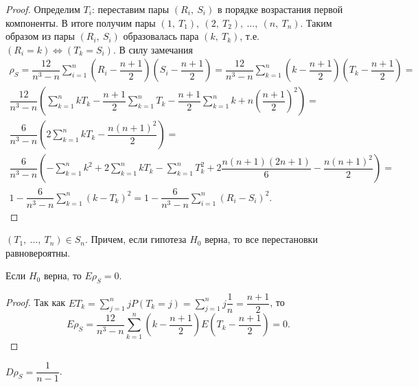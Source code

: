 \begin{proof}
    Определим $\displaystyle T_{i}$: переставим пары $\displaystyle \left( R_{i} ,\ S_{i}\right)$ в порядке возрастания первой компоненты. В итоге получим пары $\displaystyle \left( 1,\ T_{1}\right) ,\ \left( 2,\ T_{2}\right) ,\ \dotsc ,\ \left( n,\ T_{n}\right)$. Таким образом из пары $\displaystyle ( R_{i} ,\ S_{i})$ образовалась пара $\displaystyle \left( k,\ T_{k}\right)$, т.е. $\displaystyle \left( R_{i} =k\right) \Leftrightarrow \left( T_{k} =S_{i}\right)$. В силу замечания
    \begin{gather*}
        \rho _{S} =\dfrac{12}{n^{3} -n}\sum _{i=1}^{n}\left( R_{i} -\dfrac{n+1}{2}\right)\left( S_{i} -\dfrac{n+1}{2}\right) =\dfrac{12}{n^{3} -n}\sum _{k=1}^{n}\left( k-\dfrac{n+1}{2}\right)\left( T_{k} -\dfrac{n+1}{2}\right) =\\
        \dfrac{12}{n^{3} -n}\left(\sum _{k=1}^{n} kT_{k} -\dfrac{n+1}{2}\sum _{k=1}^{n} T_{k} -\dfrac{n+1}{2}\sum _{k=1}^{n} k+n\left(\dfrac{n+1}{2}\right)^{2}\right) =\\
        \dfrac{6}{n^{3} -n}\left( 2\sum _{k=1}^{n} kT_{k} -\dfrac{n( n+1)^{2}}{2}\right) =\\
        \dfrac{6}{n^{3} -n}\left( -\sum _{k=1}^{n} k^{2} +2\sum _{k=1}^{n} kT_{k} -\sum _{k=1}^{n} T_{k}^{2} +2\dfrac{n( n+1)( 2n+1)}{6} -\dfrac{n( n+1)^{2}}{2}\right) =\\
        1-\dfrac{6}{n^{3} -n}\sum _{k=1}^{n}( k-T_{k})^{2} =1-\dfrac{6}{n^{3} -n}\sum _{i=1}^{n}( R_{i} -S_{i})^{2} .
    \end{gather*}
\end{proof}
\begin{note}
    $\displaystyle ( T_{1} ,\ \dotsc ,\ T_{n}) \in S_{n}$. Причем, если гипотеза $\displaystyle H_{0}$ верна, то все перестановки равновероятны.
\end{note}
\begin{proposition}
    Если $\displaystyle H_{0}$ верна, то $\displaystyle E\rho _{S} =0$.
\end{proposition}
\begin{proof}
    Так как $\displaystyle ET_{k} =\sum _{j=1}^{n} jP( T_{k} =j) =\sum _{j=1}^{n} j\dfrac{1}{n} =\dfrac{n+1}{2}$, то
    \begin{equation*}
        E\rho _{S} =\dfrac{12}{n^{3} -n}\sum _{k=1}^{n}\left( k-\dfrac{n+1}{2}\right) E\left( T_{k} -\dfrac{n+1}{2}\right) =0.
    \end{equation*}
\end{proof}
\begin{exercise}
    $\displaystyle D\rho _{S} =\dfrac{1}{n-1}$.
\end{exercise}

